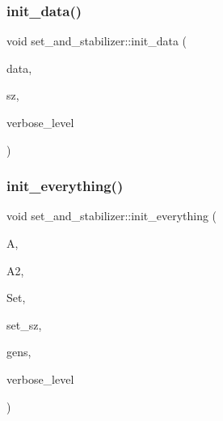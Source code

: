 \mbox{\label{classset__and__stabilizer_a5de18b17f71641c3decb7b5f57e663bd}} 
\subsubsection{\texorpdfstring{init\+\_\+data()}{init\_data()}}
{\footnotesize\ttfamily void set\+\_\+and\+\_\+stabilizer\+::init\+\_\+data (\begin{DoxyParamCaption}\item[{\mbox{\hyperlink{galois_8h_a09fddde158a3a20bd2dcadb609de11dc}{I\+NT}} $\ast$}]{data,  }\item[{\mbox{\hyperlink{galois_8h_a09fddde158a3a20bd2dcadb609de11dc}{I\+NT}}}]{sz,  }\item[{\mbox{\hyperlink{galois_8h_a09fddde158a3a20bd2dcadb609de11dc}{I\+NT}}}]{verbose\+\_\+level }\end{DoxyParamCaption})}

\mbox{\label{classset__and__stabilizer_af069e038d8a67a93a89f05a690ca4b04}} 
\subsubsection{\texorpdfstring{init\+\_\+everything()}{init\_everything()}}
{\footnotesize\ttfamily void set\+\_\+and\+\_\+stabilizer\+::init\+\_\+everything (\begin{DoxyParamCaption}\item[{\mbox{\hyperlink{classaction}{action}} $\ast$}]{A,  }\item[{\mbox{\hyperlink{classaction}{action}} $\ast$}]{A2,  }\item[{\mbox{\hyperlink{galois_8h_a09fddde158a3a20bd2dcadb609de11dc}{I\+NT}} $\ast$}]{Set,  }\item[{\mbox{\hyperlink{galois_8h_a09fddde158a3a20bd2dcadb609de11dc}{I\+NT}}}]{set\+\_\+sz,  }\item[{\mbox{\hyperlink{classstrong__generators}{strong\+\_\+generators}} $\ast$}]{gens,  }\item[{\mbox{\hyperlink{galois_8h_a09fddde158a3a20bd2dcadb609de11dc}{I\+NT}}}]{verbose\+\_\+level }\end{DoxyParamCaption})}

